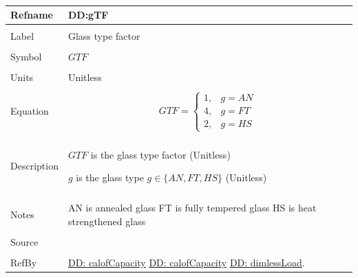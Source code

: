\documentclass[12pt]{article}
\begin{document}
~\newline
\noindent \begin{minipage}{\textwidth}
\begin{tabular}{p{} p{}}
\toprule \textbf{Refname} & \textbf{DD:gTF}
\label{DD:gTF}
\\ \midrule \\
Label & Glass type factor
\\ \midrule \\
Symbol & $GTF$
\\ \midrule \\
Units & Unitless
\\ \midrule \\
Equation & \begin{dmath}
           GTF=\begin{cases}
1, & g=AN\\
4, & g=FT\\
2, & g=HS
\end{cases}
           \end{dmath}
\\ \midrule \\
Description & \begin{symbDescription}
              \item{$GTF$ is the glass type factor (Unitless)}
              \item{$g$ is the glass type $g\in{}\{AN,FT,HS\}$ (Unitless)}
              \end{symbDescription}
\\ \midrule \\
Notes & AN is annealed glass
        FT is fully tempered glass
        HS is heat strengthened glass
\\ \midrule \\
Source & \cite{astm2009}
\\ \midrule \\
RefBy & \hyperref[DD:calofCapacity]{DD: calofCapacity} \hyperref[DD:calofCapacity]{DD: calofCapacity} \hyperref[DD:dimlessLoad]{DD: dimlessLoad}.
\\ \bottomrule \end{tabular}
\end{minipage}\\
~\newline
\end{document}
